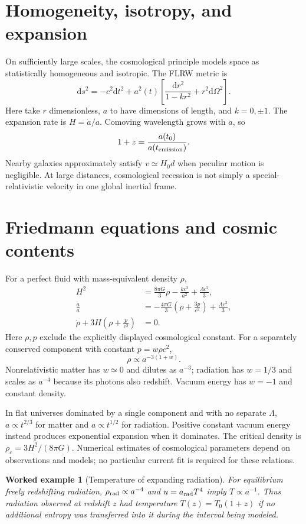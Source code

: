 \documentclass[11pt,oneside]{book}
\newcommand{\dd}{\mathrm{d}}
\theoremstyle{reviewstyle}
\newtheorem{example}{Worked example}[chapter]
\begin{document}
\section{Homogeneity, isotropy, and expansion}
On sufficiently large scales, the cosmological principle models space as statistically homogeneous and isotropic. The FLRW metric is
\begin{equation}\dd s^2=-c^2\dd t^2+a^2(t)\left[\frac{\dd r^2}{1-kr^2}+r^2\dd\Omega^2\right].\end{equation}
Here take $r$ dimensionless, $a$ to have dimensions of length, and $k=0,\pm1$. The expansion rate is $H=\dot a/a$. Comoving wavelength grows with $a$, so
\begin{equation}1+z=\frac{a(t_0)}{a(t_{\rm emission})}.\end{equation}
Nearby galaxies approximately satisfy $v\simeq H_0d$ when peculiar motion is negligible. At large distances, cosmological recession is not simply a special-relativistic velocity in one global inertial frame.
\section{Friedmann equations and cosmic contents}
For a perfect fluid with mass-equivalent density $\rho$,
\begin{align}
H^2&=\frac{8\pi G}{3}\rho-\frac{kc^2}{a^2}+\frac{\Lambda c^2}{3},\\
\frac{\ddot a}{a}&=-\frac{4\pi G}{3}\left(\rho+\frac{3p}{c^2}\right)+\frac{\Lambda c^2}{3},\\
\dot\rho+3H\left(\rho+\frac p{c^2}\right)&=0.
\end{align}
Here $\rho,p$ exclude the explicitly displayed cosmological constant. For a separately conserved component with constant $p=w\rho c^2$,
\begin{equation}\rho\propto a^{-3(1+w)}.\end{equation}
Nonrelativistic matter has $w\simeq0$ and dilutes as $a^{-3}$; radiation has $w=1/3$ and scales as $a^{-4}$ because its photons also redshift. Vacuum energy has $w=-1$ and constant density.

In flat universes dominated by a single component and with no separate $\Lambda$, $a\propto t^{2/3}$ for matter and $a\propto t^{1/2}$ for radiation. Positive constant vacuum energy instead produces exponential expansion when it dominates. The critical density is $\rho_c=3H^2/(8\pi G)$. Numerical estimates of cosmological parameters depend on observations and models; no particular current fit is required for these relations.
\begin{example}[Temperature of expanding radiation]
For equilibrium freely redshifting radiation, $\rho_{\rm rad}\propto a^{-4}$ and $u=a_{\rm rad}T^4$ imply $T\propto a^{-1}$. Thus radiation observed at redshift $z$ had temperature $T(z)=T_0(1+z)$ if no additional entropy was transferred into it during the interval being modeled.
\end{example}
\end{document}
